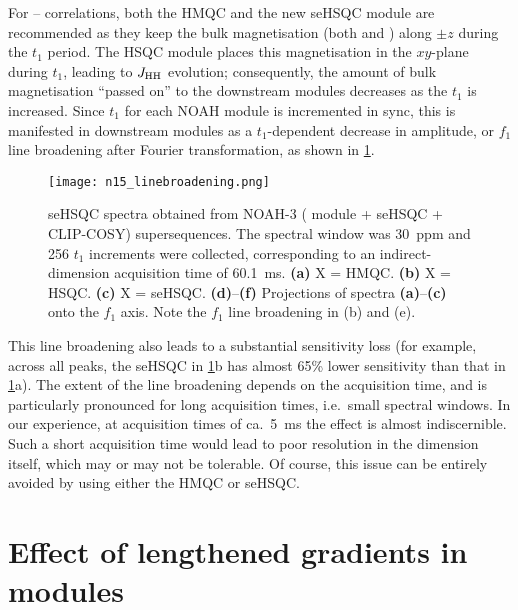For \nitrogen{}--\proton{} correlations, both the HMQC and the new seHSQC module are recommended as they keep the bulk magnetisation (both  and ) along $\pm z$ during the $t_1$ period.
The HSQC module places this magnetisation in the $xy$-plane during $t_1$, leading to $\jhh$ evolution; consequently, the amount of bulk magnetisation ``passed on'' to the downstream modules decreases as the \nitrogen{} $t_1$ is increased.
Since $t_1$ for each NOAH module is incremented in sync, this is manifested in downstream modules as a $t_1$-dependent decrease in amplitude, or $f_1$ line broadening after Fourier transformation, as shown in \cref{fig:n15_linebroadening}.

\begin{figure}
    \centering
    \texttt{[image: n15\_linebroadening.png]}
    \caption{
        \carbon{} seHSQC spectra obtained from NOAH-3  (\nitrogen{} module + \carbon{} seHSQC + CLIP-COSY) supersequences.
        The \nitrogen{} spectral window was \SI{30}{ppm} and 256 $t_1$ increments were collected, corresponding to an indirect-dimension \nitrogen{} acquisition time of \SI{60.1}{\ms}.
        \textbf{(a)} X = HMQC.
        \textbf{(b)} X = HSQC.
        \textbf{(c)} X = seHSQC.
        \textbf{(d)}--\textbf{(f)} Projections of spectra \textbf{(a)}--\textbf{(c)} onto the $f_1$ axis.
        Note the $f_1$ line broadening in (b) and (e).
        \grami{}
    }
    \label{fig:n15_linebroadening}
\end{figure}

This line broadening also leads to a substantial sensitivity loss (for example, across all peaks, the \carbon{} seHSQC in \cref{fig:n15_linebroadening}b has almost 65\% lower sensitivity than that in \cref{fig:n15_linebroadening}a).
The extent of the line broadening depends on the acquisition time, and is particularly pronounced for long acquisition times, i.e.\ small \nitrogen{} spectral windows.
In our experience, at \nitrogen{} acquisition times of ca.\ \SI{5}{\ms} the effect is almost indiscernible.
Such a short acquisition time would lead to poor resolution in the \nitrogen{} dimension itself, which may or may not be tolerable.
Of course, this issue can be entirely avoided by using either the HMQC or seHSQC.

\section{Effect of lengthened gradients in \texorpdfstring{\nitrogen{}}{15N} modules}

